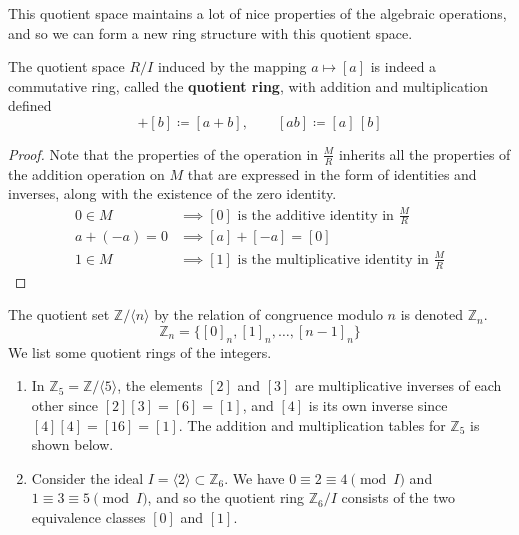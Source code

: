   This quotient space maintains a lot of nice properties of the algebraic operations, and so we can form a new ring structure with this quotient space.  

  \begin{definition}
    The quotient space $R/I$ induced by the mapping $a \mapsto [a]$ is indeed a commutative ring, called the \textbf{quotient ring}, with addition and multiplication defined 
    \begin{equation}
      [a] + [b] \coloneqq [a + b], \qquad [ab] \coloneqq [a] \, [b]
    \end{equation}
  \end{definition}
  \begin{proof}
    Note that the properties of the operation in $\frac{M}{R}$ inherits all the properties of the addition operation on $M$ that are expressed in the form of identities and inverses, along with the existence of the zero identity. 
    \begin{align*}
      0 \in M & \implies [0] \text{ is the additive identity in } \frac{M}{R} \\
      a + (-a) = 0 & \implies [a] + [-a] = [0] \\
      1 \in M & \implies [1] \text{ is the multiplicative identity in } \frac{M}{R}
    \end{align*}
  \end{proof} 

  \begin{example}
    The quotient set $\mathbb{Z}/\langle n \rangle$ by the relation of congruence modulo $n$ is denoted $\mathbb{Z}_{n}$. 
    \begin{equation}
      \mathbb{Z}_{n} = \{ [0]_{n}, [1]_{n}, \ldots, [n-1]_{n} \}
    \end{equation}
    We list some quotient rings of the integers.  
    \begin{enumerate}
      \item In $\mathbb{Z}_{5} = \mathbb{Z}/\langle 5 \rangle$, the elements $[2]$ and $[3]$ are multiplicative inverses of each other since $[2] [3] = [6] = [1]$, and $[4]$ is its own inverse since $[4] [4] = [16] = [1]$. The addition and multiplication tables for $\mathbb{Z}_5$ is shown below. 
      \item Consider the ideal $I = \langle 2 \rangle \subset \mathbb{Z}_6$. We have $0 \equiv 2 \equiv 4 \pmod{I}$ and $1 \equiv 3 \equiv 5 \pmod{I}$, and so the quotient ring $\mathbb{Z}_6 / I$ consists of the two equivalence classes $[0]$ and $[1]$. 
    \end{enumerate}
  \end{example}

